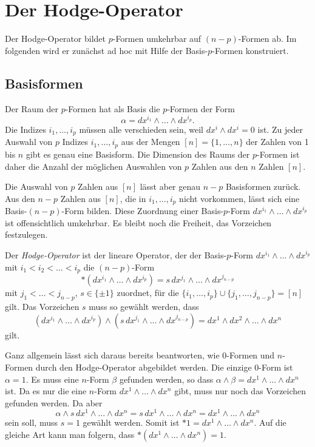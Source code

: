 %
%
%
\section{Der Hodge-Operator
\label{buch:hodge:section:hodge}}
Der Hodge-Operator bildet $p$-Formen umkehrbar auf $(n-p)$-Formen ab.
Im folgenden wird er zunächst ad hoc mit Hilfe der Basis-$p$-Formen
konstruiert.

%
%
\subsection{Basisformen}
Der Raum der $p$-Formen hat als Basis die $p$-Formen der Form
\[
\alpha = dx^{i_1}\wedge\dots\wedge dx^{i_p}.
\]
Die Indizes $i_1,\dots,i_p$ müssen alle verschieden sein, weil
$dx^i\wedge dx^i=0$ ist.
Zu jeder Auswahl von $p$ Indizes $i_1,\dots,i_p$ aus der Mengen
$[n]=\{1,\dots,n\}$ der Zahlen von 1 bis $n$ gibt es genau eine Basisform.
Die Dimension des Raums der $p$-Formen ist daher die Anzahl der möglichen
Auswahlen von $p$ Zahlen aus den $n$ Zahlen $[n]$.

Die Auswahl von $p$ Zahlen aus $[n]$ lässt aber genau $n-p$ Basisformen
zurück.
Aus den $n-p$ Zahlen aus $[n]$, die in $i_1,\dots,i_p$ nicht
vorkommen, lässt sich eine Basis-$(n-p)$-Form bilden.
Diese Zuordnung einer Basis-$p$-Form $dx^{i_1}\wedge\dots\wedge dx^{i_p}$
ist offensichtlich umkehrbar.
Es bleibt noch die Freiheit, das Vorzeichen festzulegen.

\begin{definition}
\label{buch:hodge:hodge:definition:hodge}
Der \emph{Hodge-Operator} ist der lineare Operator, der der
%
Basis-$p$-Form
$dx^{i_1}\wedge\dots\wedge dx^{i_p}$ mit $i_1<i_2<\dots<i_p$
die $(n-p)$-Form
\[
\ast(dx^{i_1}\wedge\dots\wedge dx^{i_p})
=
s\,dx^{j_1}\wedge\dots\wedge dx^{j_{n-p}}
\]
mit $j_1<\dots <j_{n-p}$, $s\in\{\pm1\}$ zuordnet, für die
$\{i_1,\dots,i_p\}\cup\{j_1,\dots,j_{n-p}\}=[n]$ gilt.
Das Vorzeichen $s$ muss so gewählt werden, dass
\[
(dx^{i_1}\wedge\dots\wedge dx^{i_p})
\wedge
(s\,dx^{j_1}\wedge\dots\wedge dx^{j_{n-p}})
=
dx^1\wedge dx^2\wedge\dots\wedge dx^n
\]
gilt.
%
\end{definition}

Ganz allgemein lässt sich daraus bereits beantworten, wie $0$-Formen und
$n$-Formen durch den Hodge-Operator abgebildet werden.
Die einzige 0-Form ist $\alpha=1$.
Es muss eine $n$-Form $\beta$ gefunden werden, so dass
$\alpha\wedge\beta=dx^1\wedge\dots\wedge dx^n$ ist.
Da es nur die eine $n$-Form $dx^1\wedge\dots\wedge dx^n$ gibt, muss
nur noch das Vorzeichen gefunden werden.
Da aber
\[
\alpha\wedge
s\,dx^1\wedge\dots\wedge dx^n
=
s\,dx^1\wedge\dots\wedge dx^n
=
dx^1\wedge\dots\wedge dx^n
\]
sein soll, muss $s=1$ gewählt werden.
Somit ist $\ast 1=dx^1\wedge\dots\wedge dx^n$.
Auf die gleiche Art kann man folgern, dass
$\ast(dx^1\wedge\dots\wedge dx^n)=1$.

